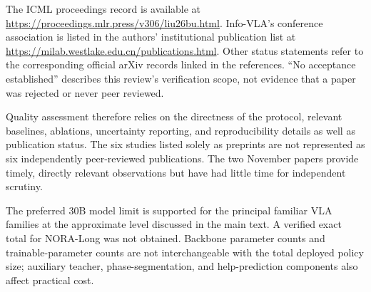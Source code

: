 The ICML proceedings record is available at \url{https://proceedings.mlr.press/v306/liu26bu.html}. Info-VLA's conference association is listed in the authors' institutional publication list at \url{https://milab.westlake.edu.cn/publications.html}. Other status statements refer to the corresponding official arXiv records linked in the references. ``No acceptance established'' describes this review's verification scope, not evidence that a paper was rejected or never peer reviewed.

Quality assessment therefore relies on the directness of the protocol, relevant baselines, ablations, uncertainty reporting, and reproducibility details as well as publication status. The six studies listed solely as preprints are not represented as six independently peer-reviewed publications. The two November papers provide timely, directly relevant observations but have had little time for independent scrutiny.

The preferred 30B model limit is supported for the principal familiar VLA families at the approximate level discussed in the main text. A verified exact total for NORA-Long was not obtained. Backbone parameter counts and trainable-parameter counts are not interchangeable with the total deployed policy size; auxiliary teacher, phase-segmentation, and help-prediction components also affect practical cost.
